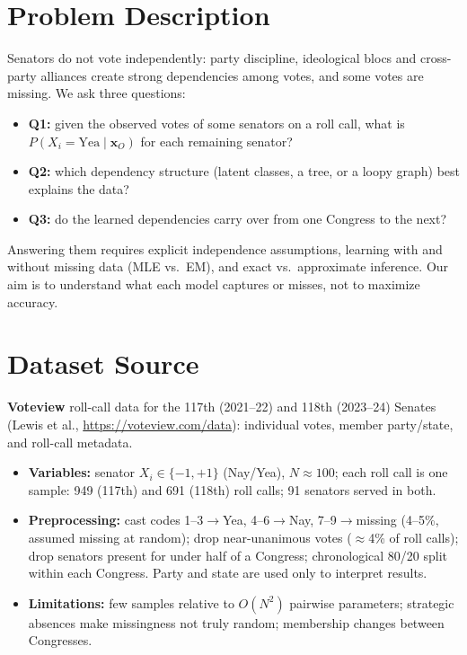 \documentclass[10pt,twocolumn]{article}
\begin{document}

\section{Problem Description}
Senators do not vote independently: party discipline, ideological blocs and cross-party alliances
create strong dependencies among votes, and some votes are missing. We ask three questions:
\begin{itemize}
\item \textbf{Q1:} given the observed votes of some senators on a roll call, what is
$P(X_i{=}\text{Yea}\mid\mathbf{x}_O)$ for each remaining senator?
\item \textbf{Q2:} which dependency structure (latent classes, a tree, or a loopy graph) best explains the data?
\item \textbf{Q3:} do the learned dependencies carry over from one Congress to the next?
\end{itemize}
Answering them requires explicit independence assumptions, learning with and without missing data
(MLE vs.\ EM), and exact vs.\ approximate inference. Our aim is to understand what each model captures
or misses, not to maximize accuracy.

\section{Dataset Source}
\textbf{Voteview} roll-call data for the 117th (2021--22) and 118th (2023--24) Senates
(Lewis et al., \url{https://voteview.com/data}): individual votes, member party/state, and roll-call metadata.
\begin{itemize}
\item \textbf{Variables:} senator $X_i\in\{-1,+1\}$ (Nay/Yea), $N\approx100$; each roll call is one sample:
949 (117th) and 691 (118th) roll calls; 91 senators served in both.
\item \textbf{Preprocessing:} cast codes 1--3$\to$Yea, 4--6$\to$Nay, 7--9$\to$missing (4--5\%, assumed
missing at random); drop near-unanimous votes ($\approx$4\% of roll calls); drop senators present for
under half of a Congress; chronological 80/20 split
within each Congress. Party and state are used only to interpret results.
\item \textbf{Limitations:} few samples relative to $O(N^2)$ pairwise parameters; strategic absences
make missingness not truly random; membership changes between Congresses.
\end{itemize}
\end{document}
